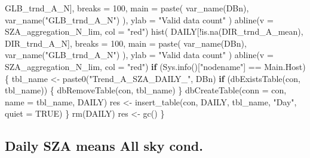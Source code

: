 \documentclass[
  10pt,
  a4paper,oneside]{article}
\newenvironment{Shaded}{\begin{snugshade}}{\end{snugshade}}
\newcommand{\AttributeTok}[1]{\textcolor[rgb]{0.77,0.63,0.00}{#1}}
\newcommand{\ConstantTok}[1]{\textcolor[rgb]{0.00,0.00,0.00}{#1}}
\newcommand{\ControlFlowTok}[1]{\textcolor[rgb]{0.13,0.29,0.53}{\textbf{#1}}}
\newcommand{\DecValTok}[1]{\textcolor[rgb]{0.00,0.00,0.81}{#1}}
\newcommand{\FunctionTok}[1]{\textcolor[rgb]{0.00,0.00,0.00}{#1}}
\newcommand{\NormalTok}[1]{#1}
\newcommand{\OtherTok}[1]{\textcolor[rgb]{0.56,0.35,0.01}{#1}}
\newcommand{\SpecialCharTok}[1]{\textcolor[rgb]{0.00,0.00,0.00}{#1}}
\newcommand{\StringTok}[1]{\textcolor[rgb]{0.31,0.60,0.02}{#1}}
\begin{document}
\begin{Shaded}
\begin{Highlighting}[]
\NormalTok{            GLB\_trnd\_A\_N], }\AttributeTok{breaks =} \DecValTok{100}\NormalTok{, }\AttributeTok{main =} \FunctionTok{paste}\NormalTok{(}
            \FunctionTok{var\_name}\NormalTok{(DBn),}
            \FunctionTok{var\_name}\NormalTok{(}\StringTok{"GLB\_trnd\_A\_N"}\NormalTok{)}
\NormalTok{        ),}
        \AttributeTok{ylab =} \StringTok{"Valid data count"}
\NormalTok{    )}
    \FunctionTok{abline}\NormalTok{(}\AttributeTok{v =}\NormalTok{ SZA\_aggregation\_N\_lim, }\AttributeTok{col =} \StringTok{"red"}\NormalTok{)}
    \FunctionTok{hist}\NormalTok{(}
\NormalTok{        DAILY[}\SpecialCharTok{!}\FunctionTok{is.na}\NormalTok{(DIR\_trnd\_A\_mean),}
\NormalTok{            DIR\_trnd\_A\_N], }\AttributeTok{breaks =} \DecValTok{100}\NormalTok{, }\AttributeTok{main =} \FunctionTok{paste}\NormalTok{(}
            \FunctionTok{var\_name}\NormalTok{(DBn),}
            \FunctionTok{var\_name}\NormalTok{(}\StringTok{"GLB\_trnd\_A\_N"}\NormalTok{)}
\NormalTok{        ),}
        \AttributeTok{ylab =} \StringTok{"Valid data count"}
\NormalTok{    )}
    \FunctionTok{abline}\NormalTok{(}\AttributeTok{v =}\NormalTok{ SZA\_aggregation\_N\_lim, }\AttributeTok{col =} \StringTok{"red"}\NormalTok{)}
    \ControlFlowTok{if}\NormalTok{ (}\FunctionTok{Sys.info}\NormalTok{()[}\StringTok{"nodename"}\NormalTok{] }\SpecialCharTok{==}\NormalTok{ Main.Host) \{}
\NormalTok{        tbl\_name }\OtherTok{\textless{}{-}} \FunctionTok{paste0}\NormalTok{(}\StringTok{"Trend\_A\_SZA\_DAILY\_"}\NormalTok{, DBn)}
        \ControlFlowTok{if}\NormalTok{ (}\FunctionTok{dbExistsTable}\NormalTok{(con, tbl\_name)) \{}
            \FunctionTok{dbRemoveTable}\NormalTok{(con, tbl\_name)}
\NormalTok{        \}}
        \FunctionTok{dbCreateTable}\NormalTok{(}\AttributeTok{conn =}\NormalTok{ con, }\AttributeTok{name =}\NormalTok{ tbl\_name, DAILY)}
\NormalTok{        res }\OtherTok{\textless{}{-}} \FunctionTok{insert\_table}\NormalTok{(con, DAILY, tbl\_name, }\StringTok{"Day"}\NormalTok{, }\AttributeTok{quiet =} \ConstantTok{TRUE}\NormalTok{)}
\NormalTok{    \}}
    \FunctionTok{rm}\NormalTok{(DAILY)}
\NormalTok{    res }\OtherTok{\textless{}{-}} \FunctionTok{gc}\NormalTok{()}
\NormalTok{\}}
\end{Highlighting}
\end{Shaded}

\FloatBarrier

\hypertarget{daily-sza-means-all-sky-cond.}{%
\subsection{Daily SZA means All sky cond.}\label{daily-sza-means-all-sky-cond.}}
\end{document}

